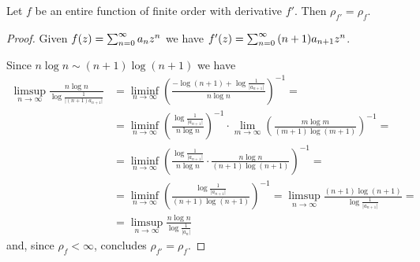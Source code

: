 \begin{proposition} \label{prop:order-derivative}
    Let $f$ be an entire function of finite order with derivative $f'$. Then $\rho_{f'} = \rho_f$.
\end{proposition}

\begin{proof}
    Given $f(z) = \sum_{n=0}^\infty {a_n}z^{n}$ we have $f'(z) = \sum_{n=0}^\infty {(n+1)a_{n+1}}z^{n}$.
    
    Since $ n \log n \sim (n+1) \log(n+1) $ we have
    \begin{align*}
        \limsup_{n \to \infty} \frac{n \log n}{\log \frac{1}{\vert (n+1) a_{n+1} \vert}} &= \liminf_{n \to \infty} \left( \frac{- \log (n+1) + \log \frac{1}{\vert a_{n+1} \vert}}{n \log n} \right)^{-1} = \\
        &= \liminf_{n \to \infty} \left( \frac{\log \frac{1}{\vert a_{n+1} \vert}}{n \log n} \right)^{-1} \cdot \lim_{m \to \infty} \left( \frac{m \log m}{(m+1) \log(m+1)} \right)^{-1} = \\
        &= \liminf_{n \to \infty} \left( \frac{\log \frac{1}{\vert a_{n+1} \vert}}{n \log n} \cdot \frac{n \log n}{(n+1) \log(n+1)} \right)^{-1} = \\
        &= \liminf_{n \to \infty} \left( \frac{\log \frac{1}{\vert a_{n+1} \vert}}{(n+1) \log(n+1)} \right)^{-1} = \limsup_{n \to \infty} \frac{(n+1) \log (n+1)}{\log \frac{1}{\vert a_{n+1} \vert}} = \\
        &= \limsup_{n \to \infty} \frac{n \log n}{\log \frac{1}{\vert a_{n} \vert}}
    \end{align*}
    and, since $\rho_f < \infty$,  concludes $\rho_{f'} = \rho_f$.
\end{proof}